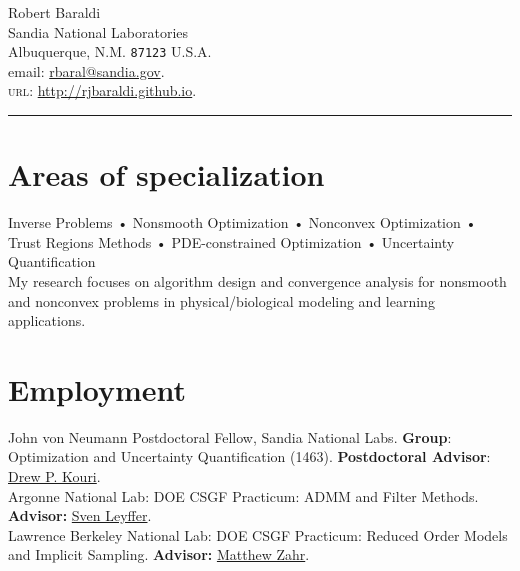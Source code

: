 \documentclass[10pt, a4paper]{article}
\newcommand{\years}[1]{\marginnote{\scriptsize #1}}
\begin{document}
{\LARGE Robert Baraldi}\\%
Sandia National Laboratories\\
Albuquerque, N.M. \texttt{87123}
U.S.A.\\[.2cm]
email: \href{mailto:rbaral@sandia.gov}{rbaral@sandia.gov}.\\
\textsc{url}: \href{http://rjbaraldi.github.io}{http://rjbaraldi.github.io}.\\

\hrule
\section*{Areas of specialization}
 Inverse Problems • Nonsmooth Optimization • Nonconvex Optimization • Trust Regions Methods • PDE-constrained Optimization • Uncertainty Quantification\\
 My research focuses on algorithm design and convergence analysis for nonsmooth and nonconvex problems in physical/biological modeling and learning applications.

\section*{Employment}
\noindent
\years{2021-}John von Neumann Postdoctoral Fellow, Sandia National Labs. \textbf{Group}: Optimization and Uncertainty Quantification (1463). \textbf{Postdoctoral Advisor}: \href{https://cfwebprod.sandia.gov/cfdocs/CompResearch/templates/insert/profile.cfm?dpkouri}{Drew P. Kouri}.\\
\years{2020} Argonne National Lab: DOE CSGF Practicum: ADMM and Filter Methods. \textbf{Advisor:} \href{https://www.anl.gov/profile/sven-leyffer}{Sven Leyffer}.\\
\years{2018} Lawrence Berkeley National Lab: DOE CSGF Practicum: Reduced Order Models and Implicit Sampling. \textbf{Advisor:} \href{https://engineering.nd.edu/profiles/mzahr}{Matthew Zahr}.\\
\end{document}
